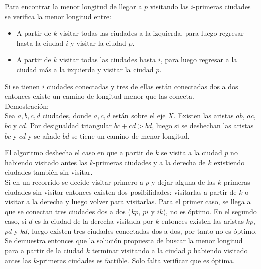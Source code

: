 \documentclass[runningheads,a4paper]{llncs}
\begin{document}
{Para encontrar la menor longitud de llegar a $p$ visitando las $i$-primeras ciudades se verifica la menor longitud entre:
\begin{itemize}
\item A partir de $k$ visitar todas las ciudades a la izquierda, para luego regresar hasta la ciudad $i$ y visitar la ciudad $p$.
\item A partir de $k$ visitar todas las ciudades hasta $i$, para luego regresar a la ciudad m\'as a la izquierda y visitar la ciudad $p$.\\
\end{itemize}  

Si se tienen $i$ ciudades conectadas y tres de ellas est\'an conectadas dos a dos entonces existe un camino de longitud menor que las conecta.\\
Demostraci\'on:\\
Sea $a, b, c, d$ ciudades, donde $a,c,d$ est\'an sobre el eje $X$. Existen las aristas $ab$, $ac$, $bc$ y $cd$. Por desigualdad triangular $bc + cd > bd$, luego si se deshechan las aristas $bc$ y $cd$ y se a\~nade $bd$ se tiene un camino de menor longitud. 

El algoritmo deshecha el caso en que a partir de $k$ se visita a la ciudad $p$ no habiendo visitado antes las $k$-primeras ciudades y a la derecha de $k$ existiendo ciudades tambi\'en sin visitar.\\
Si en un recorrido se decide visitar primero a $p$ y dejar alguna de las $k$-primeras ciudades sin visitar entonces existen dos posibilidades: visitarlas a partir de $k$ o visitar a la derecha y luego volver para visitarlas. Para el primer caso, se llega a que se conectan tres ciudades dos a dos ($kp$, $pi$ y $ik$), no es \'optimo. En el segundo caso, si $d$ es la ciudad de la derecha visitada por $k$ entonces existen las aristas $kp$, $pd$ y $kd$, luego existen tres ciudades conectadas dos a dos, por tanto no es \'optimo. Se demuestra entonces que la soluci\'on propuesta de buscar la menor longitud para a partir de la ciudad $k$ terminar visitando a la ciudad $p$ habiendo visitado antes las $k$-primeras ciudades es factible. Solo falta verificar que es \'optima.\\

}
\end{document}
